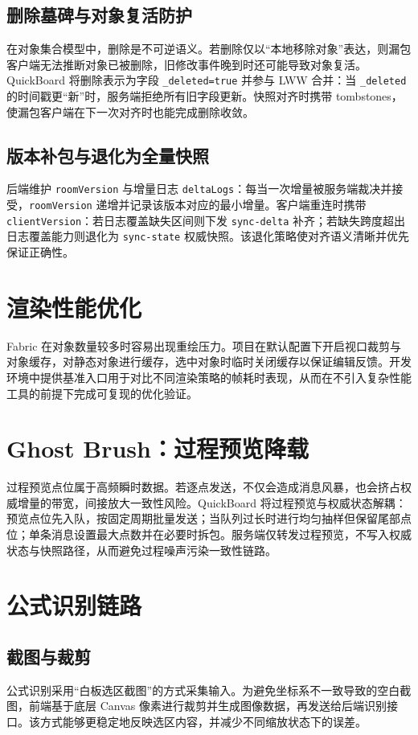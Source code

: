 \subsection{删除墓碑与对象复活防护}
在对象集合模型中，删除是不可逆语义。若删除仅以“本地移除对象”表达，则漏包客户端无法推断对象已被删除，旧修改事件晚到时还可能导致对象复活。QuickBoard 将删除表示为字段 \texttt{\_deleted=true} 并参与 LWW 合并：当 \texttt{\_deleted} 的时间戳更“新”时，服务端拒绝所有旧字段更新。快照对齐时携带 tombstones，使漏包客户端在下一次对齐时也能完成删除收敛。

\subsection{版本补包与退化为全量快照}
后端维护 \texttt{roomVersion} 与增量日志 \texttt{deltaLogs}：每当一次增量被服务端裁决并接受，\texttt{roomVersion} 递增并记录该版本对应的最小增量。客户端重连时携带 \texttt{clientVersion}：若日志覆盖缺失区间则下发 \texttt{sync-delta} 补齐；若缺失跨度超出日志覆盖能力则退化为 \texttt{sync-state} 权威快照。该退化策略使对齐语义清晰并优先保证正确性。

\section{渲染性能优化}
Fabric 在对象数量较多时容易出现重绘压力。项目在默认配置下开启视口裁剪与对象缓存，对静态对象进行缓存，选中对象时临时关闭缓存以保证编辑反馈。开发环境中提供基准入口用于对比不同渲染策略的帧耗时表现，从而在不引入复杂性能工具的前提下完成可复现的优化验证。

\section{Ghost Brush：过程预览降载}
过程预览点位属于高频瞬时数据。若逐点发送，不仅会造成消息风暴，也会挤占权威增量的带宽，间接放大一致性风险。QuickBoard 将过程预览与权威状态解耦：预览点位先入队，按固定周期批量发送；当队列过长时进行均匀抽样但保留尾部点位；单条消息设置最大点数并在必要时拆包。服务端仅转发过程预览，不写入权威状态与快照路径，从而避免过程噪声污染一致性链路。

\section{公式识别链路}
\subsection{截图与裁剪}
公式识别采用“白板选区截图”的方式采集输入。为避免坐标系不一致导致的空白截图，前端基于底层 Canvas 像素进行裁剪并生成图像数据，再发送给后端识别接口。该方式能够更稳定地反映选区内容，并减少不同缩放状态下的误差。

